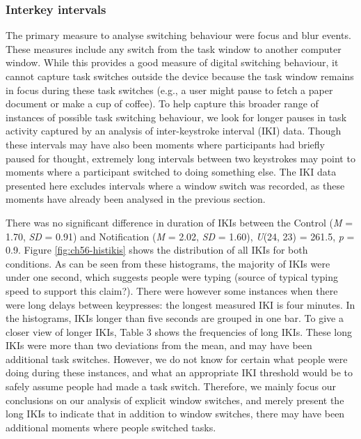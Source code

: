 \subsubsection{Interkey intervals}
The primary measure to analyse switching behaviour were focus and blur events. These measures include any switch from the task window to another computer window. While this provides a good measure of digital switching behaviour, it cannot capture task switches outside the device because the task window remains in focus during these task switches (e.g., a user might pause to fetch a paper document or make a cup of coffee). To help capture this broader range of instances of possible task switching behaviour, we look for longer pauses in task activity captured by an analysis of inter-keystroke interval (IKI) data. Though these intervals may have also been moments where participants had briefly paused for thought, extremely long intervals between two keystrokes may point to moments where a participant switched to doing something else. The IKI data presented here excludes intervals where a window switch was recorded, as these moments have already been analysed in the previous section.

There was no significant difference in duration of IKIs between the Control (\textit{M} = 1.70, \textit{SD} = 0.91) and Notification (\textit{M} = 2.02, \textit{SD} = 1.60), \textit{U}(24, 23) = 261.5, \textit{p} = 0.9. Figure \ref{fig:ch56-histikis} shows the distribution of all IKIs for both conditions. As can be seen from these histograms, the majority of IKIs were under one second, which suggests people were typing (source of typical typing speed to support this claim?).  There were however some instances when there were long delays between keypresses: the longest measured IKI is four minutes. In the histograms, IKIs longer than five seconds are grouped in one bar. To give a closer view of longer IKIs, Table 3 shows the frequencies of long IKIs. These long IKIs were more than two deviations from the mean, and may have been additional task switches. However, we do not know for certain what people were doing during these instances, and what an appropriate IKI threshold would be to safely assume people had made a task switch. Therefore, we mainly focus our conclusions on our analysis of explicit window switches, and merely present the long IKIs to indicate that in addition to window switches, there may have been additional moments where people switched tasks. 

